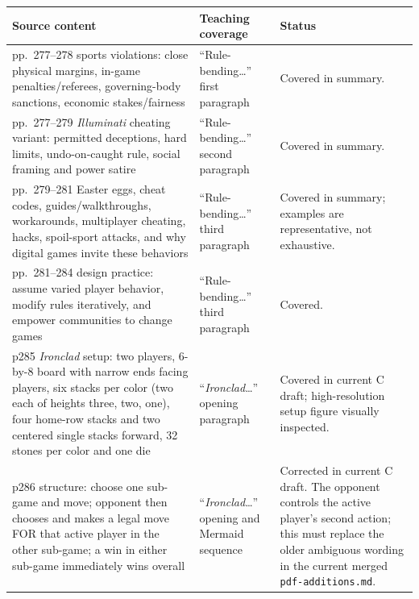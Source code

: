 {\def\LTcaptype{none} %
\begin{longtable}[]{@{}
  >{\raggedright\arraybackslash}p{}
  >{\raggedright\arraybackslash}p{}
  >{\raggedright\arraybackslash}p{}@{}}
\toprule\noalign{}
\begin{minipage}[b]{\linewidth}\raggedright
Source content
\end{minipage} & \begin{minipage}[b]{\linewidth}\raggedright
Teaching coverage
\end{minipage} & \begin{minipage}[b]{\linewidth}\raggedright
Status
\end{minipage} \\
\midrule\noalign{}
\endhead
\bottomrule\noalign{}
\endlastfoot
pp.~277--278 sports violations: close physical margins, in-game penalties/referees, governing-body sanctions, economic stakes/fairness & ``Rule-bending\ldots'' first paragraph & Covered in summary. \\
pp.~277--279 \emph{Illuminati} cheating variant: permitted deceptions, hard limits, undo-on-caught rule, social framing and power satire & ``Rule-bending\ldots'' second paragraph & Covered in summary. \\
pp.~279--281 Easter eggs, cheat codes, guides/walkthroughs, workarounds, multiplayer cheating, hacks, spoil-sport attacks, and why digital games invite these behaviors & ``Rule-bending\ldots'' third paragraph & Covered in summary; examples are representative, not exhaustive. \\
pp.~281--284 design practice: assume varied player behavior, modify rules iteratively, and empower communities to change games & ``Rule-bending\ldots'' third paragraph & Covered. \\
p285 \emph{Ironclad} setup: two players, 6-by-8 board with narrow ends facing players, six stacks per color (two each of heights three, two, one), four home-row stacks and two centered single stacks forward, 32 stones per color and one die & ``\emph{Ironclad}\ldots'' opening paragraph & Covered in current C draft; high-resolution setup figure visually inspected. \\
p286 structure: choose one sub-game and move; opponent then chooses and makes a legal move FOR that active player in the other sub-game; a win in either sub-game immediately wins overall & ``\emph{Ironclad}\ldots'' opening and Mermaid sequence & Corrected in current C draft. The opponent controls the active player's second action; this must replace the older ambiguous wording in the current merged \texttt{pdf-additions.md}. \\

\end{longtable}}
